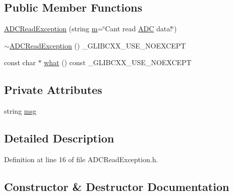 \subsection*{Public Member Functions}
\begin{DoxyCompactItemize}
\item 
\hyperlink{class_hardware_1_1_exception_1_1_a_d_c_read_exception_aaa76cf7aa3fe32c27ea600c72ea4335a}{A\+D\+C\+Read\+Exception} (string \hyperlink{_gen_blob_8m_ab3cd915d758008bd19d0f2428fbb354a}{m}=\char`\"{}Can\textquotesingle{}t read \hyperlink{class_hardware_1_1_a_d_c}{A\+D\+C} data!\char`\"{})
\item 
\hyperlink{class_hardware_1_1_exception_1_1_a_d_c_read_exception_ad59cb380b2b8eee90a87a398a3511d50}{$\sim$\+A\+D\+C\+Read\+Exception} () \+\_\+\+G\+L\+I\+B\+C\+X\+X\+\_\+\+U\+S\+E\+\_\+\+N\+O\+E\+X\+C\+E\+P\+T
\item 
const char $\ast$ \hyperlink{class_hardware_1_1_exception_1_1_a_d_c_read_exception_aa2c8ee0d183837450a0dea15901e3dc4}{what} () const \+\_\+\+G\+L\+I\+B\+C\+X\+X\+\_\+\+U\+S\+E\+\_\+\+N\+O\+E\+X\+C\+E\+P\+T
\end{DoxyCompactItemize}
\subsection*{Private Attributes}
\begin{DoxyCompactItemize}
\item 
string \hyperlink{class_hardware_1_1_exception_1_1_a_d_c_read_exception_a42211528535b1f00abf6b86d8c3429c9}{msg}
\end{DoxyCompactItemize}


\subsection{Detailed Description}


Definition at line 16 of file A\+D\+C\+Read\+Exception.\+h.



\subsection{Constructor \& Destructor Documentation}
\hypertarget{class_hardware_1_1_exception_1_1_a_d_c_read_exception_aaa76cf7aa3fe32c27ea600c72ea4335a}{}
